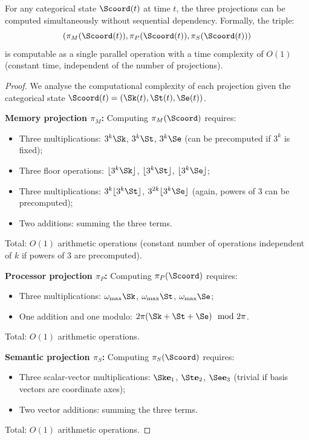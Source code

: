 \begin{theorem}
\label{thm:simultaneity}
For any categorical state $\Scoord(t)$ at time $t$, the three projections can be computed simultaneously without sequential dependency. Formally, the triple:
\begin{equation}
\left( \pi_M(\Scoord(t)), \pi_P(\Scoord(t)), \pi_S(\Scoord(t)) \right)
\label{eq:simultaneous_projections}
\end{equation}
is computable as a single parallel operation with a time complexity of $O(1)$ (constant time, independent of the number of projections).
\end{theorem}

\begin{proof}
We analyse the computational complexity of each projection given the categorical state $\Scoord(t) = (\Sk(t), \St(t), \Se(t))$.

\textbf{Memory projection $\pi_M$:} Computing $\pi_M(\Scoord)$ requires:
\begin{itemize}
    \item Three multiplications: $3^k \Sk$, $3^k \St$, $3^k \Se$ (can be precomputed if $3^k$ is fixed);
    \item Three floor operations: $\lfloor 3^k \Sk \rfloor$, $\lfloor 3^k \St \rfloor$, $\lfloor 3^k \Se \rfloor$;
    \item Three multiplications: $3^k \lfloor 3^k \St \rfloor$, $3^{2k} \lfloor 3^k \Se \rfloor$ (again, powers of 3 can be precomputed);
    \item Two additions: summing the three terms.
\end{itemize}
Total: $O(1)$ arithmetic operations (constant number of operations independent of $k$ if powers of 3 are precomputed).

\textbf{Processor projection $\pi_P$:} Computing $\pi_P(\Scoord)$ requires:
\begin{itemize}
    \item Three multiplications: $\omega_{\max} \Sk$, $\omega_{\max} \St$, $\omega_{\max} \Se$;
    \item One addition and one modulo: $2\pi(\Sk + \St + \Se) \mod 2\pi$.
\end{itemize}
Total: $O(1)$ arithmetic operations.

\textbf{Semantic projection $\pi_S$:} Computing $\pi_S(\Scoord)$ requires:
\begin{itemize}
    \item Three scalar-vector multiplications: $\Sk \mathbf{e}_1$, $\St \mathbf{e}_2$, $\Se \mathbf{e}_3$ (trivial if basis vectors are coordinate axes);
    \item Two vector additions: summing the three terms.
\end{itemize}
Total: $O(1)$ arithmetic operations.


\end{proof}
